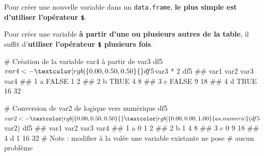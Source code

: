 \documentclass[12pt,twosided, notitlepage]{book}
\newenvironment{Shaded}{}{}
\newcommand{\CommentTok}[1]{\textcolor[rgb]{0.00,0.50,0.00}{#1}}
\newcommand{\DataTypeTok}[1]{#1}
\newcommand{\DecValTok}[1]{#1}
\newcommand{\KeywordTok}[1]{\textcolor[rgb]{0.00,0.00,1.00}{#1}}
\newcommand{\NormalTok}[1]{#1}
\newcommand{\OperatorTok}[1]{#1}
\newcommand{\OtherTok}[1]{\textcolor[rgb]{1.00,0.25,0.00}{#1}}
\newcommand{\StringTok}[1]{\textcolor[rgb]{0.00,0.50,0.50}{#1}}
\renewenvironment{Shaded}{\begin{snugshade}}{\end{snugshade}}
\begin{document}
Pour créer une nouvelle variable dans un \texttt{data.frame}, \textbf{le
plus simple est d'utiliser l'opérateur \texttt{\$}}. \index{\texttt{\$}}

\begin{Shaded}
\end{Shaded}

Pour créer une variable \textbf{à partir d'une ou plusieurs autres de la
table}, il suffit d'\textbf{utiliser l'opérateur \texttt{\$} plusieurs
fois}.

\begin{Shaded}
\begin{Highlighting}[]
\CommentTok{# Création de la variable var4 à partir de var3}
\NormalTok{df5}\OperatorTok{$}\NormalTok{var4 <-}\StringTok{ }\NormalTok{df5}\OperatorTok{$}\NormalTok{var3 }\OperatorTok{*}\StringTok{ }\DecValTok{2}
\NormalTok{df5}
\NormalTok{  ##   var1  var2 var3 var4}
\NormalTok{  ## 1    a FALSE    1    2}
\NormalTok{  ## 2    b  TRUE    4    8}
\NormalTok{  ## 3    c FALSE    9   18}
\NormalTok{  ## 4    d  TRUE   16   32}

\CommentTok{# Conversion de var2 de logique vers numérique}
\NormalTok{df5}\OperatorTok{$}\NormalTok{var2 <-}\StringTok{ }\KeywordTok{as.numeric}\NormalTok{(df5}\OperatorTok{$}\NormalTok{var2)}
\NormalTok{df5}
\NormalTok{  ##   var1 var2 var3 var4}
\NormalTok{  ## 1    a    0    1    2}
\NormalTok{  ## 2    b    1    4    8}
\NormalTok{  ## 3    c    0    9   18}
\NormalTok{  ## 4    d    1   16   32}
\CommentTok{# Note : modifier à la volée une variable existante ne pose }
\CommentTok{# aucun problème}
\end{Highlighting}
\end{Shaded}
\end{document}
